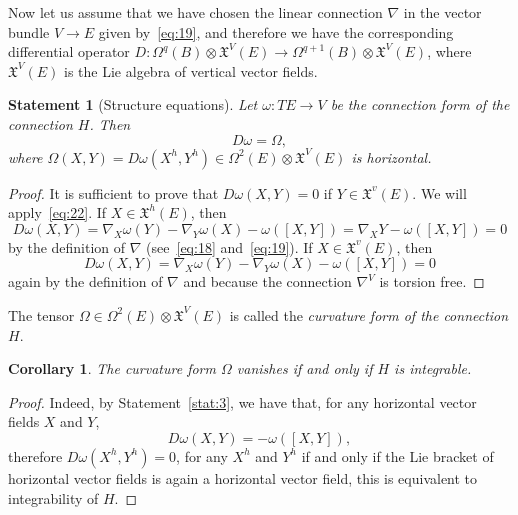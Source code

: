 \documentclass[12pt,letterpaper]{amsart}
\theoremstyle{definition}
\theoremstyle{plain}
\newtheorem{stat}{Statement}
\newtheorem{cor}{Corollary}
\theoremstyle{remark}
\begin{document}
Now let us assume that we have chosen the linear connection $\nabla$ in the vector bundle $V \to E$ given by~\eqref{eq:19}, and therefore we have the corresponding differential operator $D : \Omega^q(B) \otimes \mathfrak{X}^V(E) \to \Omega^{q + 1}(B) \otimes \mathfrak{X}^V(E)$, where $\mathfrak{X}^V(E)$ is the Lie algebra of vertical vector fields.
\begin{stat}[Structure equations]
Let $\omega : TE \to V$ be the connection form of the connection $H$.
Then
\begin{equation}
D\omega = \Omega,
\label{eq:25}
\end{equation}
where $\Omega(X, Y) = D\omega(X^h, Y^h) \in \Omega^2(E) \otimes \mathfrak{X}^V(E)$ is horizontal.
\label{stat:4}
\end{stat}
\begin{proof}
It is sufficient to prove that $D\omega(X, Y) = 0$ if $Y \in \mathfrak{X}^v(E)$.
We will apply~\eqref{eq:22}.
If $X \in \mathfrak{X}^h(E)$, then
\begin{equation}
D\omega(X, Y) = \nabla_X \omega(Y) - \nabla_Y \omega(X) - \omega( [X, Y] ) = \nabla_X Y - \omega( [X, Y] ) = 0
\label{eq:26}
\end{equation}
by the definition of $\nabla$ (see~\eqref{eq:18} and~\eqref{eq:19}).
If $X \in \mathfrak{X}^v(E)$, then
\begin{equation}
D\omega(X, Y) = \nabla_X \omega(Y) - \nabla_Y \omega(X) - \omega( [X, Y] ) = 0
\label{eq:27}
\end{equation}
again by the definition of $\nabla$ and because the connection $\nabla^V$ is torsion free.
\end{proof}
The tensor $\Omega \in \Omega^2(E) \otimes \mathfrak{X}^V(E)$ is called the \emph{curvature form of the connection $H$}.
\begin{cor}
The curvature form $\Omega$ vanishes if and only if $H$ is integrable.
\label{cor:1}
\end{cor}
\begin{proof}
Indeed, by Statement~\ref{stat:3}, we have that, for any horizontal vector fields $X$ and $Y$,
\begin{equation}
D\omega(X, Y) = - \omega([X, Y]),
\label{eq:28}
\end{equation}
therefore $D\omega(X^h, Y^h) = 0$, for any $X^h$ and $Y^h$ if and only if the Lie bracket of horizontal vector fields is again a horizontal vector field, this is equivalent to integrability of $H$.
\end{proof}
\end{document}
